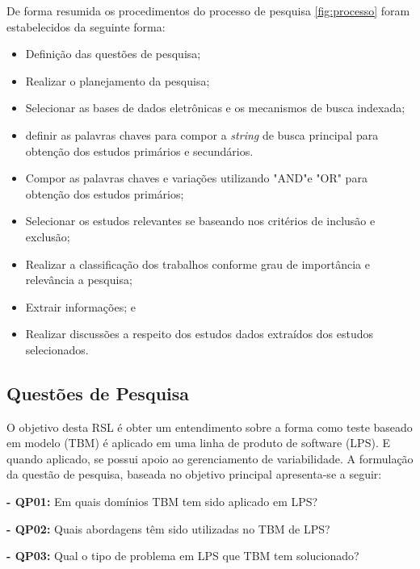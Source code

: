 De forma resumida os procedimentos do processo de pesquisa \ref{fig:processo} foram estabelecidos da seguinte forma:

\begin{itemize}
	\item Definição das questões de pesquisa;
	
	\item Realizar o planejamento da pesquisa;
	
	\item Selecionar as bases de dados eletrônicas e os mecanismos de busca indexada;
	
	\item definir as palavras chaves para compor a \textit{string} de busca principal para obtenção dos estudos primários e secundários.
	
	\item Compor as palavras chaves e variações utilizando "AND"e "OR" para obtenção
	dos estudos primários;
	
	\item Selecionar os estudos relevantes se baseando nos critérios de inclusão e exclusão;
	
	\item Realizar a classificação dos trabalhos conforme grau de importância e relevância a pesquisa;
	
	\item Extrair informações; e
	
	\item Realizar discussões a respeito dos estudos dados extraídos dos estudos selecionados.
	
\end{itemize}

\subsection{Questões de Pesquisa}
O objetivo desta RSL é obter um entendimento sobre a forma como teste baseado em modelo (TBM) é aplicado em uma linha de produto de software (LPS). E quando aplicado, se possui apoio ao gerenciamento de variabilidade.
A formulação da questão de pesquisa, baseada no objetivo principal  apresenta-se a seguir:

\textbf{- QP01:} Em quais domínios TBM tem sido aplicado em LPS?

\textbf{- QP02:} Quais abordagens têm sido utilizadas no TBM de LPS?

\textbf{- QP03:} Qual o tipo de problema em LPS que TBM tem solucionado?

